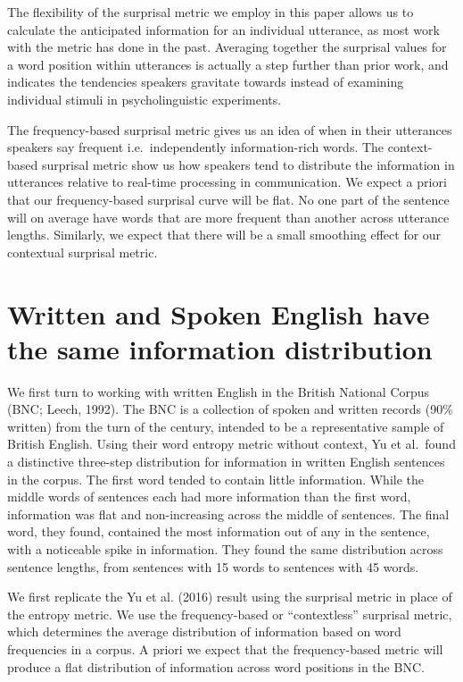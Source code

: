 \documentclass[11pt,]{article}
\begin{document}
The flexibility of the surprisal metric we employ in this paper allows us to calculate the anticipated information for an individual utterance, as most work with the metric has done in the past. Averaging together the surprisal values for a word position within utterances is actually a step further than prior work, and indicates the tendencies speakers gravitate towards instead of examining individual stimuli in psycholinguistic experiments.

The frequency-based surprisal metric gives us an idea of when in their utterances speakers say frequent i.e.~independently information-rich words. The context-based surprisal metric show us how speakers tend to distribute the information in utterances relative to real-time processing in communication. We expect a priori that our frequency-based surprisal curve will be flat. No one part of the sentence will on average have words that are more frequent than another across utterance lengths. Similarly, we expect that there will be a small smoothing effect for our contextual surprisal metric.

\hypertarget{written-and-spoken-english-have-the-same-information-distribution}{%
\section{Written and Spoken English have the same information distribution}\label{written-and-spoken-english-have-the-same-information-distribution}}

We first turn to working with written English in the British National Corpus (BNC; Leech, 1992). The BNC is a collection of spoken and written records (90\% written) from the turn of the century, intended to be a representative sample of British English. Using their word entropy metric without context, Yu et al.~found a distinctive three-step distribution for information in written English sentences in the corpus. The first word tended to contain little information. While the middle words of sentences each had more information than the first word, information was flat and non-increasing across the middle of sentences. The final word, they found, contained the most information out of any in the sentence, with a noticeable spike in information. They found the same distribution across sentence lengths, from sentences with 15 words to sentences with 45 words.

We first replicate the Yu et al. (2016) result using the surprisal metric in place of the entropy metric. We use the frequency-based or ``contextless'' surprisal metric, which determines the average distribution of information based on word frequencies in a corpus. A priori we expect that the frequency-based metric will produce a flat distribution of information across word positions in the BNC.
\end{document}
